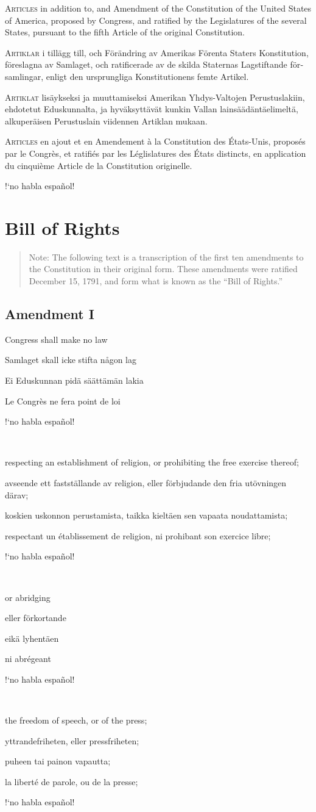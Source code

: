 \documentclass[a4paper,landscape,10pt]{article}
\newcommand{\tblock}[5]{\noindent\begin{minipage}[t]{0.18\textwidth}\foreignlanguage{english}{#1}\end{minipage}\hskip 0.025\textwidth\begin{minipage}[t]{0.18\textwidth}\foreignlanguage{swedish}{#2}\end{minipage}\hskip 0.025\textwidth\begin{minipage}[t]{0.18\textwidth}\foreignlanguage{finnish}{#3}\end{minipage}\hskip 0.025\textwidth\begin{minipage}[t]{0.18\textwidth}\foreignlanguage{french}{#4}\end{minipage}\hskip 0.025\textwidth\begin{minipage}[t]{0.18\textwidth}\foreignlanguage{spanish}{#5}\end{minipage}}
\begin{document}
\tblock
{\textsc{Articles} in addition to, and Amendment of the Constitution of the United States of America, proposed by Congress, and ratified by the Legislatures of the several States, pursuant to the fifth Article of the original Constitution.}
{\textsc{Artiklar} i tillägg till, och Förändring av Amerikas Förenta Staters Konstitution, föreslagna av Samlaget, och ratificerade av de skilda Staternas Lagstiftande församlingar, enligt den ursprungliga Konstitutionens femte Artikel.}
{\textsc{Artiklat} lisäykseksi ja muuttamiseksi Amerikan Yhdys-Valtojen Perustuslakiin, ehdotetut Eduskunnalta, ja hyväksyttävät kunkin Vallan lainsäädäntäelimeltä, alkuperäisen Perustuslain viidennen Artiklan mukaan.}
{\textsc{Articles} en ajout et en Amendement à la Constitution des États-Unis, proposés par le Congrès, et ratifiés par les Léglislatures des États distincts, en application du cinquième Article de la Constitution originelle.}
{!`no habla español!}

\section*{Bill of Rights}
\begin{quote}\small{}
Note: The following text is a transcription of the first ten amendments to the Constitution in their original form. These amendments were ratified December 15, 1791, and form what is known as the ``Bill of Rights.''
\end{quote}
\subsection*{Amendment I}
\tblock
{Congress shall make no law}
{Samlaget skall icke stifta någon lag}
{Ei Eduskunnan pidä säättämän lakia}
{Le Congrès ne fera point de loi}
{!`no habla español!}

~

\tblock
{respecting an establishment of religion, or prohibiting the free exercise thereof;}
{avseende ett fastställande av religion, eller förbjudande den fria utövningen därav;}
{koskien uskonnon perustamista, taikka kieltäen sen vapaata noudattamista;}
{respectant un établissement de religion, ni prohibant son exercice libre;}
{!`no habla español!}

~

\tblock
{or abridging}
{eller förkortande}
{eikä lyhentäen}
{ni abrégeant}
{!`no habla español!}

~

\tblock
{the freedom of speech, or of the press;}
{yttrandefriheten, eller pressfriheten;}
{puheen tai painon vapautta;}
{la liberté de parole, ou de la presse;}
{!`no habla español!}
\end{document}
